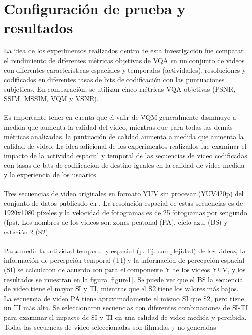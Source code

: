 \documentclass[conference]{IEEEtran}
\begin{document}
\section{Configuración de prueba y resultados}
    La idea de los experimentos realizados dentro de esta investigación 
    fue comparar el rendimiento de diferentes métricas objetivas de VQA 
    en un conjunto de videos con diferentes características espaciales y 
    temporales (actividades), resoluciones y codificados en diferentes 
    tasas de bits de codificación con las puntuaciones subjeticas. En 
    comparación, se utilizan cinco métricas VQA objetivas (PSNR, SSIM, 
    MSSIM, VQM y VSNR).\\
    \\
    Es importante tener en cuenta que el valir de VQM generalmente 
    disminuye a medida que aumenta la calidad del video, mientras que 
    para todas las demás métricas analizadas, la puntuación de calidad 
    aumenta a medida que aumenta la calidad de video. La idea adicional 
    de los experimentos realizados fue examinar el impacto de la 
    actividad espacial y temporal de las secuencias de video codificadas 
    con tasas de bits de codificación de destino iguales en la calidad de 
    video medida y la experiencia de los usuarios.\\
    \\
    Tres secuencias de video originales en formato YUV sin 
    procesar (YUV420p) del conjunto de datos publicado en \cite{biblio21}. La 
    resolución espacial de estas secuencias es de 1920x1080 píxeles y 
    la velocidad de fotogramas es de 25 fotogramas por sengundo (fps).
    Los nombres de los videos son zonas peatonal (PA), cielo azul (BS) y 
    estación 2 (S2).\\
    \\
    Para medir la actividad temporal y espacial (p. Ej. 
    complejidad) de los videos, la información de percepción temporal 
    (TI) y la información de percepción espacial (SI) se calcularon de 
    acuerdo con \cite{biblio22} para el componente Y de los videos YUV, y los 
    resultados se muestran en la figura \ref{figure1}. Se puede ver que el BS la 
    secuencia de video tiene el mayor SI y TI, mientras que el S2 tiene los 
    valores más bajos. La secuencia de video PA tiene aproximadamente 
    el mismo SI que S2, pero tiene un TI más alto. Se seleccionaron 
    secuencias con diferentes combinaciones de SI-TI para examinar el 
    impacto de SI y TI en una calidad de video medida y percibida. Todas 
    las secuencas de video seleccionadas son filmadas y no generadas 
\end{document}
